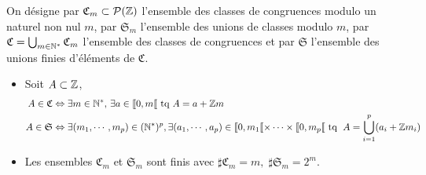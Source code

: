 \begin{defi}
On désigne par $\mathfrak{C}_m \subset \mathcal{P}(\mathbb{Z})$ l'ensemble des classes de congruences modulo un naturel non nul $m$, par $\mathfrak{S}_m$ l'ensemble des unions de classes modulo $m$, par $\mathfrak{C} = \bigcup_{m \in \mathbb{N}^*}\mathfrak{C}_m$ l'ensemble des classes de congruences et par $\mathfrak{S}$ l'ensemble des unions finies d'éléments de $\mathfrak{C}$.
\end{defi}
\begin{rems}
 \begin{itemize}
  \item Soit $A \subset \mathbb{Z}$,
  \begin{align*}
 A \in \mathfrak{C}  &\Leftrightarrow \exists m\in \mathbb{N}^*,\, \exists a \in \llbracket 0, m \llbracket \text{ tq } A = a + \mathbb{Z} m \\
 A\in \mathfrak{S} &\Leftrightarrow \exists (m_1,\cdots,m_p) \in (\mathbb{N}^*)^p, \exists (a_1,\cdots,a_p)\in \llbracket 0,m_1\llbracket \times \dots \times \llbracket 0,m_p\llbracket \text{ tq }\;
 A = \bigcup_{i=1}^{p}(a_i + \mathbb{Z} m_i)
  \end{align*}
    \item Les ensembles $\mathfrak{C}_m$ et $\mathfrak{S}_m$ sont finis avec $\sharp \mathfrak{C}_m = m, \; \sharp \mathfrak{S}_m = 2^m$.
  \end{itemize}
\end{rems}

